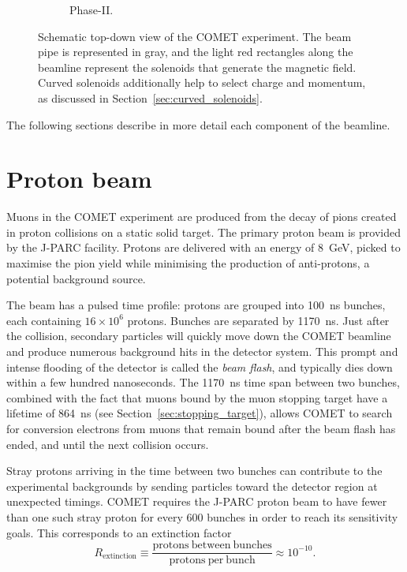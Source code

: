 \begin{figure}
\begin{subfigure}[b]{0.49\textwidth}
        \caption{Phase-II.}
    \end{subfigure}
    \caption{ Schematic top-down view of the COMET experiment. The beam pipe is
    represented in gray, and the light red rectangles along the beamline
    represent the solenoids that generate the magnetic field. Curved solenoids
    additionally help to select charge and momentum, as discussed in
    Section~\ref{sec:curved_solenoids}.}
    \label{fig:comet_schematic}
\end{figure}

The following sections describe in more detail each component of the beamline.


\section{Proton beam}\label{sec:COMET_beam}
Muons in the COMET experiment are produced from the decay of pions created in
proton collisions on a static solid target. The primary proton beam is provided
by the J-PARC facility. Protons are delivered with an energy of \SI{8}{\GeV},
picked to maximise the pion yield while minimising the production of
anti-protons, a potential background source.

The beam has a pulsed time profile: protons are grouped into \SI{100}{\ns}
bunches, each containing $16\times 10^6$ protons. Bunches are separated by
\SI{1170}{\ns}. Just after the collision, secondary particles will quickly move
down the COMET beamline and produce numerous background hits in the detector
system. This prompt and intense flooding of the detector is called the
\emph{beam flash}, and typically dies down within a few hundred nanoseconds. The
\SI{1170}{\ns} time span between two bunches, combined with the fact that muons
bound by the muon stopping target have a lifetime of \SI{864}{\ns} (see
Section~\ref{sec:stopping_target}), allows COMET to search for conversion
electrons from muons that remain bound after the beam flash has ended, and until
the next collision occurs.



Stray protons arriving in the time between two bunches can contribute to the
experimental backgrounds by sending particles toward the detector region at
unexpected timings. COMET requires the J-PARC proton beam to have fewer than one
such stray proton for every 600 bunches in order to reach its sensitivity goals.
This corresponds to an extinction factor
\begin{equation}\label{eq:extinction}
R_\mathrm{extinction} \equiv \frac{\mathrm{protons\ between\
bunches}}{\mathrm{protons\ per\ bunch}} \approx 10^{-10}.
\end{equation}


